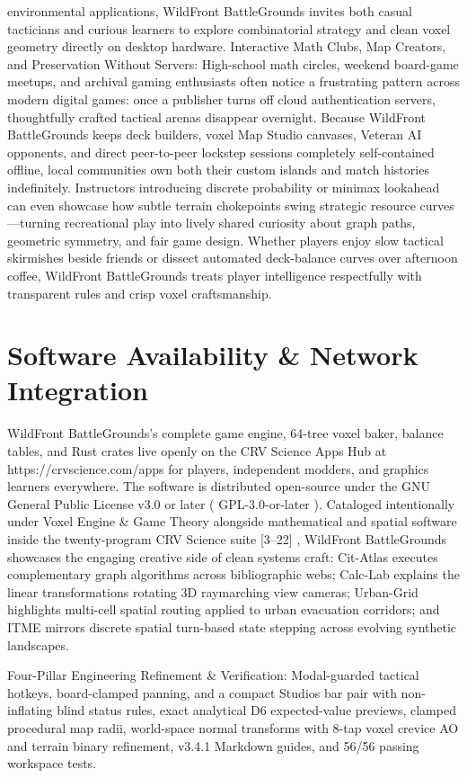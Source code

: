 \documentclass[10pt,letterpaper]{article}
\begin{document}
environmental applications, WildFront BattleGrounds invites both casual tacticians and curious learners to explore combinatorial strategy and clean voxel geometry directly on desktop hardware. Interactive Math Clubs, Map Creators, and Preservation Without Servers: High-school math circles, weekend board-game meetups, and archival gaming enthusiasts often notice a frustrating pattern across modern digital games: once a publisher turns off cloud authentication servers, thoughtfully crafted tactical arenas disappear overnight. Because WildFront BattleGrounds keeps deck builders, voxel Map Studio canvases, Veteran AI opponents, and direct peer-to-peer lockstep sessions completely self-contained offline, local communities own both their custom islands and match histories indefinitely. Instructors introducing discrete probability or minimax lookahead can even showcase how subtle terrain chokepoints swing strategic resource curves---turning recreational play into lively shared curiosity about graph paths, geometric symmetry, and fair game design. Whether players enjoy slow tactical skirmishes beside friends or dissect automated deck-balance curves over afternoon coffee, WildFront BattleGrounds treats player intelligence respectfully with transparent rules and crisp voxel craftsmanship.

\section{Software Availability \& Network Integration}
WildFront BattleGrounds's complete game engine, 64-tree voxel baker, balance tables, and Rust crates live openly on the CRV Science Apps Hub at https://crvscience.com/apps for players, independent modders, and graphics learners everywhere. The software is distributed open-source under the GNU General Public License v3.0 or later ( GPL-3.0-or-later ). Cataloged intentionally under Voxel Engine \& Game Theory alongside mathematical and spatial software inside the twenty-program CRV Science suite [3--22] , WildFront BattleGrounds showcases the engaging creative side of clean systems craft: Cit-Atlas executes complementary graph algorithms across bibliographic webs; Calc-Lab explains the linear transformations rotating 3D raymarching view cameras; Urban-Grid highlights multi-cell spatial routing applied to urban evacuation corridors; and ITME mirrors discrete spatial turn-based state stepping across evolving synthetic landscapes.

Four-Pillar Engineering Refinement \& Verification: Modal-guarded tactical hotkeys, board-clamped panning, and a compact Studios bar pair with non-inflating blind status rules, exact analytical D6 expected-value previews, clamped procedural map radii, world-space normal transforms with 8-tap voxel crevice AO and terrain binary refinement, v3.4.1 Markdown guides, and 56/56 passing workspace tests.
\end{document}
